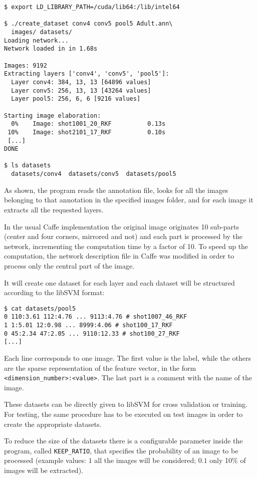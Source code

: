 \footnotesize\begin{verbatim}
$ export LD_LIBRARY_PATH=/cuda/lib64:/lib/intel64

$ ./create_dataset conv4 conv5 pool5 Adult.ann\
  images/ datasets/
Loading network...
Network loaded in in 1.68s

Images: 9192
Extracting layers ['conv4', 'conv5', 'pool5']:
  Layer conv4: 384, 13, 13 [64896 values]
  Layer conv5: 256, 13, 13 [43264 values]
  Layer pool5: 256, 6, 6 [9216 values]

Starting image elaboration:
  0%    Image: shot1001_20_RKF          0.13s
 10%    Image: shot2101_17_RKF          0.10s
 [...]
DONE

$ ls datasets
  datasets/conv4  datasets/conv5  datasets/pool5
\end{verbatim}
\normalsize

As shown, the program reads the annotation file, looks for all the images
belonging to that annotation in the specified images folder, and for each image
it extracts all the requested layers.

In the usual Caffe implementation the original image originates 10 sub-parts
(center and four corners, mirrored and not) and each part is processed by the
network, incrementing the computation time by a factor of 10. To speed up the
computation, the network description file in Caffe was modified in order to
process only the central part of the image. 

It will create one dataset for each layer and each dataset will be structured
according to the libSVM format:
\footnotesize\begin{verbatim}
$ cat datasets/pool5
0 110:3.61 112:4.76 ... 9113:4.76 # shot1007_46_RKF
1 1:5.01 12:0.98 ... 8999:4.06 # shot100_17_RKF
0 45:2.34 47:2.05 ... 9110:12.33 # shot100_27_RKF
[...]
\end{verbatim}
\normalsize

Each line corresponds to one image. The first value is the label, while the
others are the sparse representation of the feature vector, in the form
\verb|<dimension_number>:<value>|. The last part is a comment with the name of
the image.

These datasets can be directly given to libSVM for cross validation or training.
For testing, the same procedure has to be executed on test images in order to
create the appropriate datasets.

To reduce the size of the datasets there is a configurable parameter inside the
program, called \verb|KEEP_RATIO|, that specifies the probability of an image to
be processed (example values: $1$ all the images will be considered; $0.1$ only
10\% of images will be extracted).


